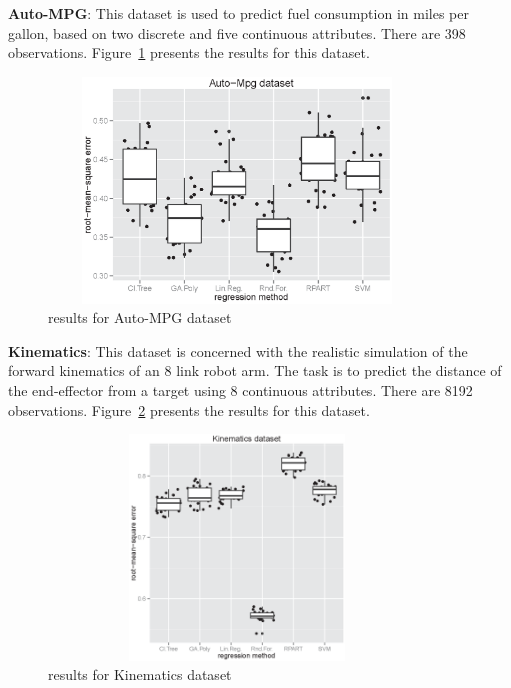 \documentclass[a4paper, 12pt]{article}
\begin{document}

\textbf{Auto-MPG}: This dataset is used to predict fuel consumption in miles per gallon, based on two discrete and five continuous attributes. There are 398 observations. Figure~\ref{Auto-Mpg_dataset_lambda0.8_25runs} presents the results for this dataset.

\begin{figure}[htb]
	\begin{center}
		\includegraphics[height=6cm,width=10cm,angle=0]
			{figures/Auto-Mpg_dataset_lambda0.8_25runs.eps}
		\caption{results for Auto-MPG dataset}
		\label{Auto-Mpg_dataset_lambda0.8_25runs}
	\end{center}
\end{figure}


\textbf{Kinematics}: This dataset is concerned with the realistic simulation of the forward kinematics of an 8 link robot arm. The task is to predict the distance of the end-effector from a target using 8 continuous attributes. There are 8192 observations. Figure~\ref{Kinematics300_lambda0.8_25runs} presents the results for this dataset.

\begin{figure}[htb]
	\begin{center}
		\includegraphics[height=6cm,width=10cm,angle=0]
			{figures/Kinematics300_lambda0.8_25runs.eps}
		\caption{results for Kinematics dataset}
		\label{Kinematics300_lambda0.8_25runs}
	\end{center}
\end{figure}
\end{document}
